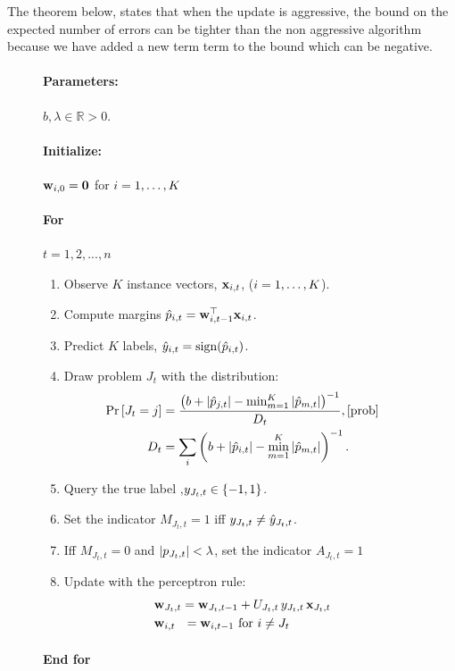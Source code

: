 {The theorem below, states that when the update is aggressive, the bound on the expected number of errors can be tighter than the non aggressive algorithm because we have added a new term term to the bound which can be negative.     

\label{sec:FO_aggressive_alg}
\begin{figure}[h]
\paragraph{Parameters:}$b, \lambda \in\mathbb{R}>0$.
\paragraph{Initialize:} $\mathbf{w}_{i,0}={\boldsymbol{0}}$ for $i=1, \ldots , K$
\paragraph{For}  {$t=1,2, ..., n$} 
\begin{enumerate}
\nolineskips
\item Observe $K$ instance vectors, $\mathbf{x}_{i,t}$, ($i=1 , \ldots , K$).
\item Compute margins $\hat{p}_{i,t}={\mathbf{w}}^{\top}_{i,t-1} \mathbf{x}_{i,t}$.
\item Predict $K$ labels, $\hat{y}_{i,t}={\rm sign}(\hat{p}_{i,t})$.
\item Draw problem $J_t$  with the distribution:
\begin{align}
\pr{J_t=j} &=
\frac{\paren{b+\abs{\hat{p}_{j,t}}-\min_{m=1}^K\abs{\hat{p}_{m,t}}}^{-1}}{D_{t}}, \eqref{prob}\nonumber\\
D_t &=
\sum_i \paren{b+\abs{\hat{p}_{i,t}}-\min_{m=1}^K\abs{\hat{p}_{m,t}}}^{-1}. \nonumber
\end{align}
\item Query the true label ,$y_{J_t,t}\in\{-1,1\}$.
\item Set the indicator $M_{J_t, t}=1$ iff $y_{J_t,t} \neq \hat{y}_{J_t,t}$.
\item Iff $M_{J_t, t}=0$ and $\left\vert{p_{J_t,t}}\right\vert<\lambda$, set  the indicator $A_{J_t,t}=1$
\item Update with the perceptron rule:
\begin{align}
&\mathbf{w}_{J_t,t} = \mathbf{w}_{J_t,t-1}+U_{J_t,t} \, y_{J_t,t}\, \mathbf{x}_{J_t,t} \label{update_rule}\\
&\mathbf{w}_{i,t} ~~= \mathbf{w}_{i,t-1}  \textrm{ for } i \neq J_t \nonumber
\end{align}
\end{enumerate}
\paragraph{End for} 

\end{figure}}
